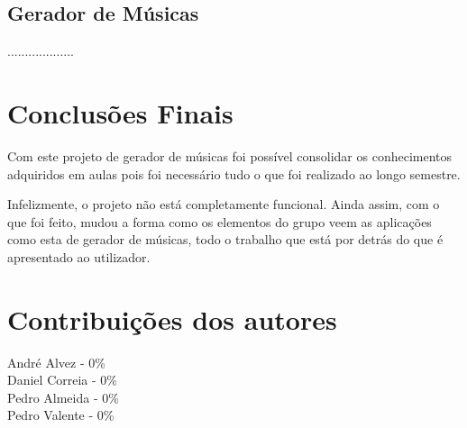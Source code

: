 \documentclass{report}
\begin{document}
\section{Gerador de Músicas}
\label{chap.gerador}
...................

	 
\chapter{Conclusões Finais}
\label{chap.conclusao}
	Com este projeto de gerador de músicas foi possível consolidar os conhecimentos 
	adquiridos em aulas pois foi necessário tudo o que foi realizado ao longo semestre. 
	
	Infelizmente, o projeto não está completamente funcional. Ainda assim, com o que foi feito, mudou a forma como os 
	elementos do grupo veem as aplicações como esta de gerador de músicas, todo o trabalho que está por detrás do que é 
	apresentado ao utilizador.  

 
\chapter{Contribuições dos autores}
\label{contribuições}

\noindent
André Alvez - 0\% \\
Daniel Correia - 0\% \\
Pedro Almeida - 0\% \\
Pedro Valente - 0\% 
\end{document}
